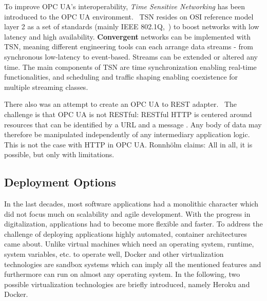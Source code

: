 To improve OPC UA's interoperability, \textit{Time Sensitive Networking} has been introduced to the OPC UA environment.~\cite{Wilmes2019ZauberwortKonvergenz} TSN resides on OSI reference model layer 2 as a set of standards (mainly  IEEE 802.1Q,~\cite{IEEE2014IEEENetworks}) to boost networks with low latency and high availability. \textbf{Convergent} networks can be implemented with TSN, meaning different engineering tools can each arrange data streams - from synchronous low-latency to event-based. Streams can be extended or altered any time. The main components of TSN are time synchronization enabling real-time functionalities, and scheduling and traffic shaping enabling coexistence for multiple streaming classes.

There also was an attempt to create an OPC UA to REST adapter.~\cite{Ronnholm2018IntegrationTranslator} The challenge is that OPC UA is not RESTful: RESTful HTTP is centered around resources that can be identified by a URL and a message . Any body of data may therefore be manipulated independently of any intermediary application logic. This is not the case with HTTP in OPC UA. Ronnhölm claims:  All in all, it is possible, but only with limitations.

\subsection {Deployment Options}
\label{deploymentoptions}
In the last decades, most software applications had a monolithic character which did not focus much on scalability and agile development. With the progress in digitalization, applications had to become more flexible and faster. To address the challenge of deploying applications highly automated, container architectures came about. Unlike virtual machines which need an operating system, runtime, system variables, etc. to operate well, Docker and other virtualization technologies are sandbox systems which can imply all the mentioned features and furthermore can run on almost any operating system. In the following, two possible virtualization technologies are briefly introduced, namely Heroku and Docker.~\cite{Wurbs2017Docker2018.}

